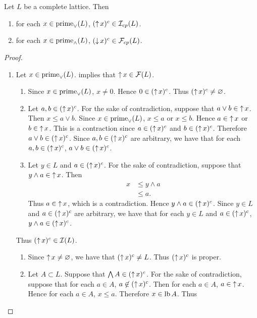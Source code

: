 \documentclass{book}
\begin{document}
	\begin{ex}
		Let $L$ be a complete lattice. Then 
		\begin{enumerate}
			\item for each $x \in \operatorname*{\text{prime}_{\vee}}(L)$, $(\operatorname{\uparrow} x)^c \in \mathcal{I}_{cp}(L)$.
			\item for each $x \in \operatorname*{\text{prime}_{\wedge}}(L)$, $(\operatorname{\downarrow} x)^c \in \mathcal{F}_{cp}(L)$.
		\end{enumerate}
	\end{ex}
	
	\begin{proof}\
		\begin{enumerate}
			\item Let $x \in \operatorname*{\text{prime}_{\vee}}(L)$.  implies that $\operatorname{\uparrow} x \in \mathcal{F}(L)$. 
			\begin{enumerate}
				\item Since $x \in \operatorname*{\text{prime}_{\vee}}(L)$, $x \neq 0$. Hence $0 \in (\operatorname{\uparrow} x)^c$. Thus $(\operatorname{\uparrow} x)^c \neq \varnothing$.
				\item Let $a,b \in (\operatorname{\uparrow} x)^c$. For the sake of contradiction, suppose that $a \vee b \in \operatorname{\uparrow} x$. Then $x \leq a \vee b$. Since $x \in \operatorname*{\text{prime}_{\vee}}(L)$, $x \leq a$ or $x \leq b$. Hence $a \in \operatorname{\uparrow} x$ or $b \in \operatorname{\uparrow} x$. This is a contraction since $a \in (\operatorname{\uparrow} x)^c$ and $b \in (\operatorname{\uparrow} x)^c$. Therefore $a \vee b \in (\operatorname{\uparrow} x)^c$. Since $a,b \in (\operatorname{\uparrow} x)^c$ are arbitrary, we have that for each $a,b \in (\operatorname{\uparrow} x)^c$, $a \vee b \in (\operatorname{\uparrow} x)^c$.
				\item Let $y \in L$ and $a \in (\operatorname{\uparrow} x)^c$. For the sake of contradiction, suppose that $y \wedge a \in \operatorname{\uparrow} x$. Then 
				\begin{align*}
					x 
					& \leq y \wedge a \\
					& \leq a.
				\end{align*}
				Thus $a \in \operatorname{\uparrow} x$, which is a contradiction. Hence $y \wedge a \in (\operatorname{\uparrow} x)^c$. Since $y \in L$ and $a \in (\operatorname{\uparrow} x)^c$ are arbitrary, we have that for each $y \in L$ and $a \in (\operatorname{\uparrow} x)^c$,  $y \wedge a \in (\operatorname{\uparrow} x)^c$. 
			\end{enumerate}
			Thus $(\operatorname{\uparrow} x)^c \in \mathcal{I}(L)$.
			\begin{enumerate}
				\item Since $\operatorname{\uparrow} x \neq \varnothing$, we have that $(\operatorname{\uparrow} x)^c \neq L$. Thus $(\operatorname{\uparrow} x)^c$ is proper.
				\item Let $A \subset L$. Suppose that $\bigwedge A \in (\operatorname{\uparrow} x)^c$. For the sake of contradiction, suppose that for each $a \in A$, $a \not \in (\operatorname{\uparrow} x)^c$. Then for each $a \in A$, $a \in \operatorname{\uparrow} x$. Hence for each $a \in A$, $x \leq a$. Therefore $x \in \operatorname{lb} A$. Thus 

\end{enumerate}
\end{enumerate}
\end{proof}
\end{document}
